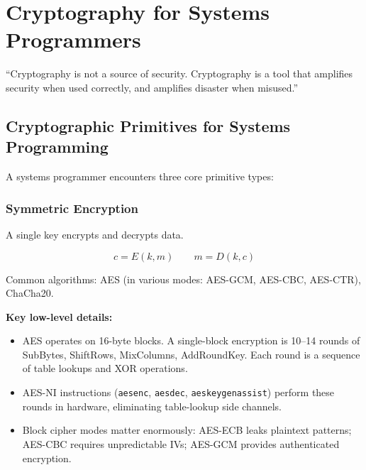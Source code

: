 \chapter{Cryptography for Systems Programmers}
\label{ch:crypto}

\epigraph{``Cryptography is not a source of security. Cryptography is a tool that amplifies security when used correctly, and amplifies disaster when misused.''}{}


\section{Cryptographic Primitives for Systems Programming}

A systems programmer encounters three core primitive types:

\subsection{Symmetric Encryption}

A single key encrypts and decrypts data.

\[
	c = E(k, m) \quad\quad m = D(k, c)
\]

Common algorithms: AES (in various modes: AES-GCM, AES-CBC, AES-CTR), ChaCha20.

\textbf{Key low-level details:}
\begin{itemize}
	\item AES operates on 16-byte blocks. A single-block encryption is 10--14 rounds of SubBytes, ShiftRows, MixColumns, AddRoundKey. Each round is a sequence of table lookups and XOR operations.
	\item AES-NI instructions (\texttt{aesenc}, \texttt{aesdec}, \texttt{aeskeygenassist}) perform these rounds in hardware, eliminating table-lookup side channels.
	\item Block cipher modes matter enormously: AES-ECB leaks plaintext patterns; AES-CBC requires unpredictable IVs; AES-GCM provides authenticated encryption.
\end{itemize}


